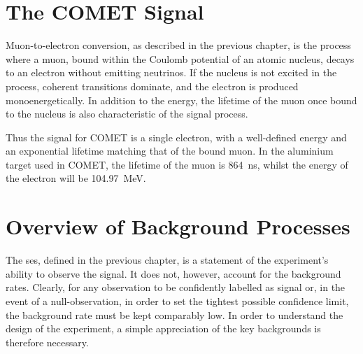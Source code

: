 \section{The COMET Signal}
Muon-to-electron conversion, as described in the previous chapter, is the process where a muon, bound within the Coulomb potential of an atomic nucleus, decays to an electron without emitting neutrinos.
If the nucleus is not excited in the process, coherent transitions dominate, and the electron is produced monoenergetically.
In addition to the energy, the lifetime of the muon once bound to the nucleus is also characteristic  of the signal process.

Thus the signal for COMET is a single electron, with a well-defined energy and an exponential lifetime matching that of the bound muon.
In the aluminium target used in COMET, the lifetime of the muon is 864~ns, whilst the energy of the electron will be 104.97~MeV.

\section{Overview of Background Processes}
The \acf{ses}, defined in the previous chapter, is a statement of the experiment's ability to observe the \mueconv signal.
It does not, however, account for the background rates.
Clearly, for any observation to be confidently labelled as signal or, in the event of a null-observation, in order to set the tightest possible confidence limit, the background rate must be kept comparably low.
In order to understand the design of the \COMET experiment, a simple appreciation of the key backgrounds is therefore necessary.


